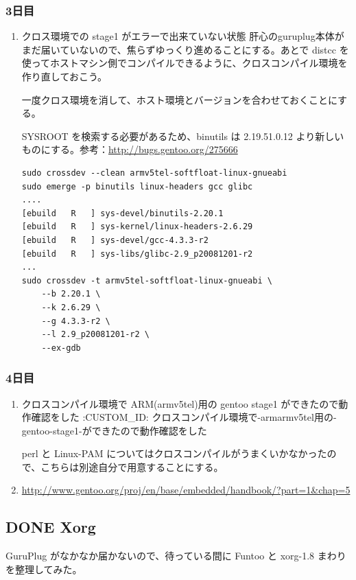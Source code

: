\documentclass[11pt]{article}
\begin{document}
\subsubsection{3日目}
\label{sec:org50ce199}
\begin{enumerate}
\item クロス環境での stage1 がエラーで出来ていない状態
\label{sec:org10ca299}
肝心のguruplug本体がまだ届いていないので、焦らずゆっくり進めることにする。あとで distcc を使ってホストマシン側でコンパイルできるように、クロスコンパイル環境を作り直しておこう。

一度クロス環境を消して、ホスト環境とバージョンを合わせておくことにする。

SYSROOT を検索する必要があるため、binutils は 2.19.51.0.12 より新しいものにする。参考：\url{http://bugs.gentoo.org/275666}

\begin{verbatim}
sudo crossdev --clean armv5tel-softfloat-linux-gnueabi
sudo emerge -p binutils linux-headers gcc glibc
....
[ebuild   R   ] sys-devel/binutils-2.20.1
[ebuild   R   ] sys-kernel/linux-headers-2.6.29
[ebuild   R   ] sys-devel/gcc-4.3.3-r2
[ebuild   R   ] sys-libs/glibc-2.9_p20081201-r2
...
sudo crossdev -t armv5tel-softfloat-linux-gnueabi \
    --b 2.20.1 \
    --k 2.6.29 \
    --g 4.3.3-r2 \
    --l 2.9_p20081201-r2 \
    --ex-gdb
\end{verbatim}
\end{enumerate}
\subsubsection{4日目}
\label{sec:orgefd1e5b}
\begin{enumerate}
\item クロスコンパイル環境で ARM(armv5tel)用の gentoo stage1
\label{sec:org8850d63}
ができたので動作確認をした
:CUSTOM\_ID: クロスコンパイル環境で-armarmv5tel用の-gentoo-stage1-ができたので動作確認をした

perl と Linux-PAM についてはクロスコンパイルがうまくいかなかったので、こちらは別途自分で用意することにする。
\item \url{http://www.gentoo.org/proj/en/base/embedded/handbook/?part=1\&chap=5}
\label{sec:org4e18bce}
\end{enumerate}
\subsection{{\bfseries\sffamily DONE} Xorg}
\label{sec:orgd61214c}
GuruPlug がなかなか届かないので、待っている間に Funtoo と xorg-1.8 まわりを整理してみた。
\end{document}
